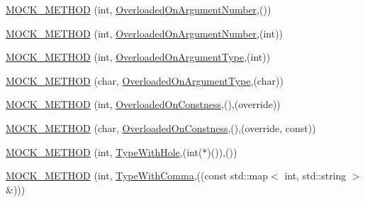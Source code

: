 \begin{DoxyCompactItemize}
\item 
\mbox{\hyperlink{classtesting_1_1gmock__function__mocker__test_1_1_mock_foo_ae7564f6d942087d67512b521fb355f94}{M\+O\+C\+K\+\_\+\+M\+E\+T\+H\+OD}} (int, \mbox{\hyperlink{classtesting_1_1gmock__function__mocker__test_1_1_foo_interface_ae27d00da9698493b196d0913dd5b6c1a}{Overloaded\+On\+Argument\+Number}},())
\item 
\mbox{\hyperlink{classtesting_1_1gmock__function__mocker__test_1_1_mock_foo_ab859902d52f376112fa8c8d5ca402d8a}{M\+O\+C\+K\+\_\+\+M\+E\+T\+H\+OD}} (int, \mbox{\hyperlink{classtesting_1_1gmock__function__mocker__test_1_1_foo_interface_ae27d00da9698493b196d0913dd5b6c1a}{Overloaded\+On\+Argument\+Number}},(int))
\item 
\mbox{\hyperlink{classtesting_1_1gmock__function__mocker__test_1_1_mock_foo_a6c4bc14602957c662e9ace719cf0fd96}{M\+O\+C\+K\+\_\+\+M\+E\+T\+H\+OD}} (int, \mbox{\hyperlink{classtesting_1_1gmock__function__mocker__test_1_1_foo_interface_a78fc84ae56ba53a36047f0791d03fc58}{Overloaded\+On\+Argument\+Type}},(int))
\item 
\mbox{\hyperlink{classtesting_1_1gmock__function__mocker__test_1_1_mock_foo_ae7680c58ebcf5f91c5f190043528b313}{M\+O\+C\+K\+\_\+\+M\+E\+T\+H\+OD}} (char, \mbox{\hyperlink{classtesting_1_1gmock__function__mocker__test_1_1_foo_interface_a78fc84ae56ba53a36047f0791d03fc58}{Overloaded\+On\+Argument\+Type}},(char))
\item 
\mbox{\hyperlink{classtesting_1_1gmock__function__mocker__test_1_1_mock_foo_a57a7faaeec9d76031292fa532c35c0c6}{M\+O\+C\+K\+\_\+\+M\+E\+T\+H\+OD}} (int, \mbox{\hyperlink{classtesting_1_1gmock__function__mocker__test_1_1_foo_interface_a94e43dbddc176d1702a7a7d7281f2642}{Overloaded\+On\+Constness}},(),(override))
\item 
\mbox{\hyperlink{classtesting_1_1gmock__function__mocker__test_1_1_mock_foo_a83b1f88fdda3669b8c600daee345bbbc}{M\+O\+C\+K\+\_\+\+M\+E\+T\+H\+OD}} (char, \mbox{\hyperlink{classtesting_1_1gmock__function__mocker__test_1_1_foo_interface_a94e43dbddc176d1702a7a7d7281f2642}{Overloaded\+On\+Constness}},(),(override, const))
\item 
\mbox{\hyperlink{classtesting_1_1gmock__function__mocker__test_1_1_mock_foo_a0a0a46aa356c5f7314a37fc1a4d16720}{M\+O\+C\+K\+\_\+\+M\+E\+T\+H\+OD}} (int, \mbox{\hyperlink{classtesting_1_1gmock__function__mocker__test_1_1_foo_interface_aa14850645cd7a5462480f1717df5153c}{Type\+With\+Hole}},(int($\ast$)()),())
\item 
\mbox{\hyperlink{classtesting_1_1gmock__function__mocker__test_1_1_mock_foo_ab6c0fd6e1285132fb787053cd89ec5ab}{M\+O\+C\+K\+\_\+\+M\+E\+T\+H\+OD}} (int, \mbox{\hyperlink{classtesting_1_1gmock__function__mocker__test_1_1_foo_interface_af1f1d96db798fadbf53fbd886e7c738e}{Type\+With\+Comma}},((const std\+::map$<$ int, std\+::string $>$ \&)))

\end{DoxyCompactItemize}

